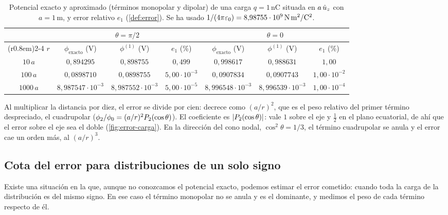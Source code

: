 \begin{table}[ht]
\centering
\caption{Potencial exacto y aproximado (términos monopolar y dipolar) de una carga $q=1\,\mathrm{nC}$ situada en $a\,\hat{u}_{z}$ con $a=1\,\mathrm{m}$, y error relativo
$e_{1}$ (\cref{def:error}). Se ha usado $1/(4\pi\varepsilon_{0})=8{,}98755\cdot10^{9}\,\mathrm{N\,m^{2}/C^{2}}$.}
\label{tab:error-carga}
\renewcommand{\arraystretch}{1.25}
\small\setlength{\tabcolsep}{3.5pt}
\begin{tabular}{@{}c@{\quad}ccc@{\quad}ccc@{}}
  \toprule
  & \multicolumn{3}{c}{$\theta=\pi/2$} & \multicolumn{3}{c}{$\theta=0$}\\
  \cmidrule(r{0.8em}){2-4}\cmidrule{5-7}
  $r$ & $\phi_{\mathrm{exacto}}$ (V) & $\phi^{(1)}$ (V) & $e_{1}$ (\%) & $\phi_{\mathrm{exacto}}$ (V) & $\phi^{(1)}$ (V) & $e_{1}$ (\%)\\
  \midrule
  $10\,a$   & $0{,}894295$  & $0{,}898755$  & $0{,}499$              & $0{,}998617$  & $0{,}988631$  & $1{,}00$\\
  $100\,a$  & $0{,}0898710$ & $0{,}0898755$ & $5{,}00\cdot10^{-3}$   & $0{,}0907834$ & $0{,}0907743$ & $1{,}00\cdot10^{-2}$\\
  $1000\,a$ & $8{,}987547\cdot10^{-3}$ & $8{,}987552\cdot10^{-3}$ & $5{,}00\cdot10^{-5}$ & $8{,}996548\cdot10^{-3}$ & $8{,}996539\cdot10^{-3}$ & $1{,}00\cdot10^{-4}$\\
  \bottomrule
\end{tabular}
\end{table}



\begin{observacion}\label{obs:error-carga}
Al multiplicar la distancia por diez, el error se divide por cien: decrece como $(a/r)^{2}$, que es el peso relativo del primer término despreciado, el
cuadrupolar ($\phi_{2}/\phi_{0}=(a/r)^{2}P_{2}(\cos\theta)$). El coeficiente es $\lvert P_{2}(\cos\theta)\rvert$: vale $1$ sobre el eje y $\frac12$ en el plano ecuatorial, de
ahí que el error sobre el eje sea el doble (\cref{fig:error-carga}). En la dirección del cono nodal, $\cos^{2}\theta=1/3$, el término cuadrupolar se anula y el error cae
un orden más, al $(a/r)^{3}$.
\end{observacion}

\subsection{Cota del error para distribuciones de un solo signo}\label{sec:cota}
Existe una situación en la que, aunque no conozcamos el potencial exacto, podemos estimar el error cometido: cuando toda la carga de la distribución es del
mismo signo. En ese caso el término monopolar no se anula y es el dominante, y medimos el peso de cada término respecto de él.

